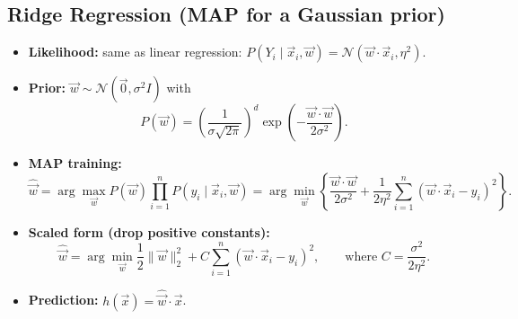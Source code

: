 \subsection{Ridge Regression (MAP for a Gaussian prior)}
\begin{itemize}
    \item \textbf{Likelihood:} same as linear regression:
    $P(Y_i\mid \vec{x}_i,\vec{w})=\mathcal{N}(\vec{w}\!\cdot\!\vec{x}_i,\eta^2)$.
    \item \textbf{Prior:} $\vec{w}\sim \mathcal{N}(\vec{0},\sigma^2 I)$ with
    \[
      P(\vec{w})=\left(\frac{1}{\sigma\sqrt{2\pi}}\right)^d
      \exp\!\left(-\frac{\vec{w}\!\cdot\!\vec{w}}{2\sigma^2}\right).
    \]
    \item \textbf{MAP training:}
    \[
      \hat{\vec{w}}=\arg\max_{\vec{w}} P(\vec{w})\prod_{i=1}^n P(y_i\mid \vec{x}_i,\vec{w})
      =\arg\min_{\vec{w}} \left\{\frac{\vec{w}\!\cdot\!\vec{w}}{2\sigma^2}
      +\frac{1}{2\eta^2}\sum_{i=1}^n(\vec{w}\!\cdot\!\vec{x}_i-y_i)^2\right\}.
    \]
    \item \textbf{Scaled form (drop positive constants):}
    \[
      \hat{\vec{w}}=\arg\min_{\vec{w}} \frac{1}{2}\|\vec{w}\|_2^2
      + C\sum_{i=1}^n(\vec{w}\!\cdot\!\vec{x}_i-y_i)^2,
      \qquad \text{where } C=\frac{\sigma^2}{2\eta^2}.
    \]
    \item \textbf{Prediction:} $h(\vec{x})=\hat{\vec{w}}\!\cdot\!\vec{x}$.
\end{itemize}

